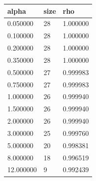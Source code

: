 \begin{tabular}{lll}
\hline
alpha & size & rho \\
\hline
0.050000 & 28 & 1.000000 \\
0.100000 & 28 & 1.000000 \\
0.200000 & 28 & 1.000000 \\
0.350000 & 28 & 1.000000 \\
0.500000 & 27 & 0.999983 \\
0.750000 & 27 & 0.999983 \\
1.000000 & 26 & 0.999940 \\
1.500000 & 26 & 0.999940 \\
2.000000 & 26 & 0.999940 \\
3.000000 & 25 & 0.999760 \\
5.000000 & 20 & 0.998381 \\
8.000000 & 18 & 0.996519 \\
12.000000 & 9 & 0.992439 \\
\hline
\end{tabular}
